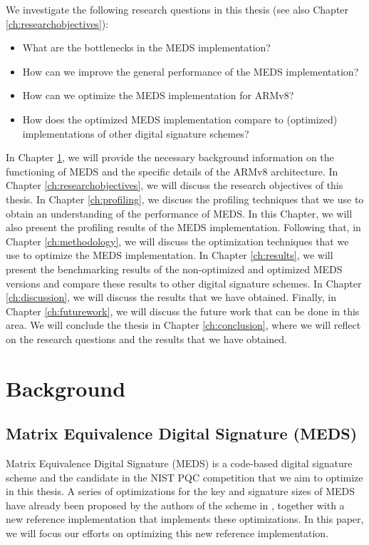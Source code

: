 \documentclass[11pt,a4paper]{report}
\begin{document}
We investigate the following research questions in this thesis (see also Chapter \ref{ch:researchobjectives}):
\begin{itemize}
  \item What are the bottlenecks in the MEDS implementation?
  \item How can we improve the general performance of the MEDS implementation?
  \item How can we optimize the MEDS implementation for ARMv8?
  \item How does the optimized MEDS implementation compare to (optimized) implementations of other digital signature schemes?
\end{itemize}

In Chapter \ref{ch:background}, we will provide the necessary background information on the functioning of MEDS and the specific details of the ARMv8 architecture. In Chapter \ref{ch:researchobjectives}, we will discuss the research objectives of this thesis. In Chapter \ref{ch:profiling}, we discuss the profiling techniques that we use to obtain an understanding of the performance of MEDS. In this Chapter, we will also present the profiling results of the MEDS implementation. Following that, in Chapter \ref{ch:methodology}, we will discuss the optimization techniques that we use to optimize the MEDS implementation. In Chapter \ref{ch:results}, we will present the benchmarking results of the non-optimized and optimized MEDS versions and compare these results to other digital signature schemes. In Chapter \ref{ch:discussion}, we will discuss the results that we have obtained. Finally, in Chapter \ref{ch:futurework}, we will discuss the future work that can be done in this area. We will conclude the thesis in Chapter \ref{ch:conclusion}, where we will reflect on the research questions and the results that we have obtained.

\chapter{Background}
\label{ch:background}

\section{Matrix Equivalence Digital Signature (MEDS)}
\label{sec:meds}
Matrix Equivalence Digital Signature (MEDS) \cite{chou2023take} is a code-based digital signature scheme and the candidate in the NIST PQC competition that we aim to optimize in this thesis. A series of optimizations for the key and signature sizes of MEDS have already been proposed by the authors of the scheme in \cite{chou2024reducing}, together with a new reference implementation that implements these optimizations. In this paper, we will focus our efforts on optimizing this new reference implementation.
\end{document}
